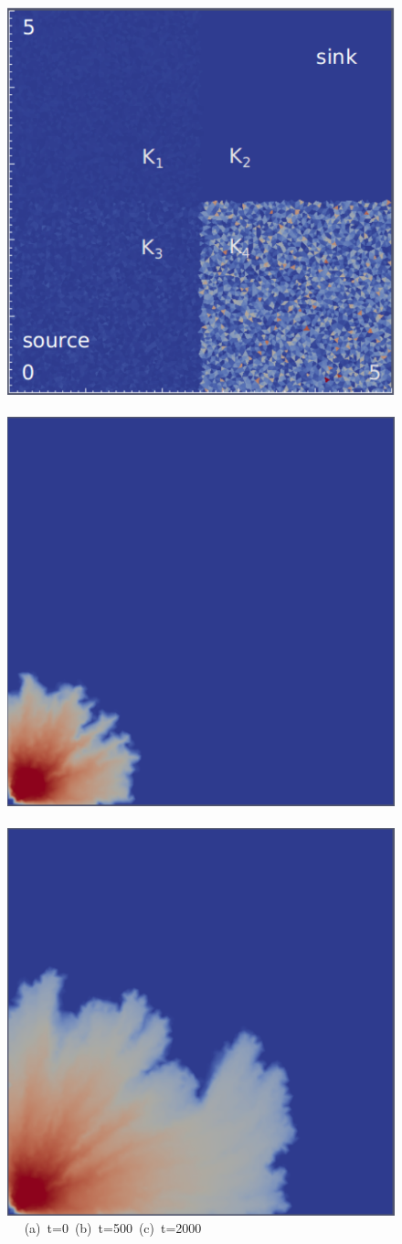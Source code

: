 \begin{landscape}
  \begin{figure}[ht]
  \vbox{\vspace{-1cm}
      \hbox{\includegraphics[width=.5\textwidth]{./Pics1/Saffman_heterogeneous/saffman_heter_fixed_1.pdf}
            \includegraphics[width=.5\textwidth]{./Pics1/Saffman_heterogeneous/saffman_heter_fixed_500.pdf} 
            \includegraphics[width=.5\textwidth]{./Pics1/Saffman_heterogeneous/saffman_heter_fixed_2000.pdf} }
      \hbox{\hspace{2.0cm} (a) t=0 \hspace{5.cm} (b) t=500 \hspace{4.0cm} (c) t=2000}
}
\end{figure}
\end{landscape}
